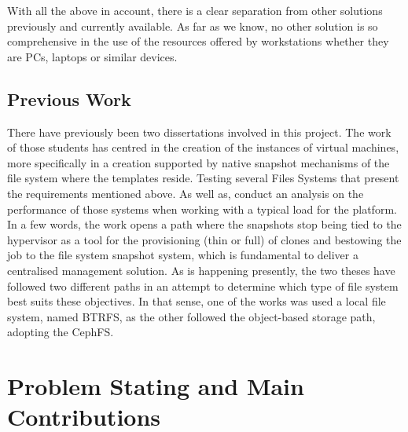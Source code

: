 With all the above in account, there is a clear separation from other solutions previously and currently available. As far as we know, no other solution is so comprehensive in the use of the resources offered by workstations whether they are PCs, laptops or similar devices.



\subsection{Previous Work} %
\label{sub:previous_work}

There have previously been two dissertations involved in this project. The work of those students has centred in the creation of the instances of virtual machines, more specifically in a creation supported by native snapshot mechanisms of the file system where the templates reside. Testing several Files Systems that present the requirements mentioned above. As well as, conduct an analysis on the performance of those systems when working with a typical load for the platform. 
In a few words, the work opens a path where the snapshots stop being tied to the hypervisor as a tool for the provisioning (thin or full) of clones and bestowing the job to the file system snapshot system, which is fundamental to deliver a centralised management solution.
As is happening presently, the two theses have followed two different paths in an attempt to determine which type of file system best suits these objectives. 
In that sense, one of the works was used a local file system, named BTRFS, as the other followed the object-based storage path, adopting the CephFS.



\section{Problem Stating and Main Contributions}
\label{sec:project_contributions}

